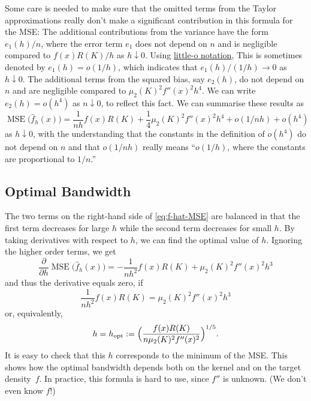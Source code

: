 \documentclass[
  a4paper,
]{article}
\theoremstyle{definition}
\theoremstyle{definition}
\theoremstyle{definition}
\theoremstyle{definition}
\theoremstyle{remark}
\begin{document}
Some care is needed to make sure that the omitted terms from the Taylor
approximations really don't make a significant contribution in this formula for
the MSE: The additional contributions from the variance have the form \(e_1(h)
/ n\), where the error term \(e_1\) does not depend on \(n\) and is negligible
compared to \(f(x) R(K) / h\) as \(h \downarrow 0\). Using
\href{https://en.wikipedia.org/wiki/Big_O_notation\#Little-o_notation}{little-o notation},
This is sometimes denoted by \(e_1(h) = o(1/h)\), which indicates that \(e_1(h) /
(1/h) \to 0\) as \(h \downarrow 0\). The additional terms from the squared bias, say
\(e_2(h)\), do not depend on \(n\) and are negligible compared to \(\mu_2(K)^2
f''(x)^2 h^4\). We can write \(e_2(h) = o(h^4)\) as \(n \downarrow 0\), to reflect
this fact. We can summarise these results as
\begin{equation*}
  \mathop{\mathrm{MSE}}\nolimits\bigl( \hat f_h(x) \bigr)
  = \frac{1}{nh} f(x) R(K)
      + \frac14 \mu_2(K)^2 f''(x)^2 h^4
      + o(1/nh) + o(h^4)
\end{equation*}
as \(h \downarrow 0\),
with the understanding that the constants in the definition of \(o(h^4)\)
do not depend on \(n\) and that \(o(1/nh)\) really means ``\(o(1/h)\), where the
constants are proportional to \(1/n\).''

\subsection{Optimal Bandwidth}\label{optimal-bandwidth}

The two terms on the right-hand side of \eqref{eq:f-hat-MSE} are balanced in
that the first term decreases for large \(h\) while the second term decreases for
small \(h\). By taking derivatives with respect to \(h\), we can
find the optimal value of \(h\). Ignoring the higher order terms, we get
\begin{equation*}
  \frac{\partial}{\partial h} \mathop{\mathrm{MSE}}\nolimits\bigl( \hat f_h(x) \bigr)
  = -\frac{1}{nh^2} f(x) R(K) + \mu_2(K)^2 f''(x)^2 h^3
\end{equation*}
and thus the derivative equals zero, if
\begin{equation*}
  \frac{1}{nh^2} f(x) R(K) = \mu_2(K)^2 f''(x)^2 h^3
\end{equation*}
or, equivalently,
\begin{equation*}
  h
  = h_\mathrm{opt}
  := \Bigl( \frac{f(x) R(K)}{n \mu_2(K)^2 f''(x)^2} \Bigr)^{1/5}.
\end{equation*}
It is easy to check that this \(h\) corresponds to the minimum of the MSE.
This shows how the optimal bandwidth depends both on the kernel and on
the target density~\(f\). In practice, this formula is hard to use,
since \(f''\) is unknown. (We don't even know \(f\)!)
\end{document}
